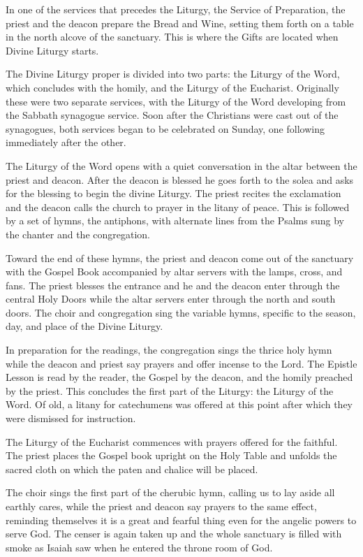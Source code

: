\documentclass[
]{article}
\begin{document}
In one of the services that precedes the Liturgy, the Service of
Preparation, the priest and the deacon prepare the Bread and Wine,
setting them forth on a table in the north alcove of the sanctuary. This
is where the Gifts are located when Divine Liturgy starts.

The Divine Liturgy proper is divided into two parts: the Liturgy of the
Word, which concludes with the homily, and the Liturgy of the Eucharist.
Originally these were two separate services, with the Liturgy of the
Word developing from the Sabbath synagogue service. Soon after the
Christians were cast out of the synagogues, both services began to be
celebrated on Sunday, one following immediately after the other.

The Liturgy of the Word opens with a quiet conversation in the altar
between the priest and deacon. After the deacon is blessed he goes forth
to the solea and asks for the blessing to begin the divine Liturgy. The
priest recites the exclamation and the deacon calls the church to prayer
in the litany of peace. This is followed by a set of hymns, the
antiphons, with alternate lines from the Psalms sung by the chanter and
the congregation.

Toward the end of these hymns, the priest and deacon come out of the
sanctuary with the Gospel Book accompanied by altar servers with the
lamps, cross, and fans. The priest blesses the entrance and he and the
deacon enter through the central Holy Doors while the altar servers
enter through the north and south doors. The choir and congregation sing
the variable hymns, specific to the season, day, and place of the Divine
Liturgy.

In preparation for the readings, the congregation sings the thrice holy
hymn while the deacon and priest say prayers and offer incense to the
Lord. The Epistle Lesson is read by the reader, the Gospel by the
deacon, and the homily preached by the priest. This concludes the first
part of the Liturgy: the Liturgy of the Word. Of old, a litany for
catechumens was offered at this point after which they were dismissed
for instruction.

The Liturgy of the Eucharist commences with prayers offered for the
faithful. The priest places the Gospel book upright on the Holy Table
and unfolds the sacred cloth on which the paten and chalice will be
placed.

The choir sings the first part of the cherubic hymn, calling us to lay
aside all earthly cares, while the priest and deacon say prayers to the
same effect, reminding themselves it is a great and fearful thing even
for the angelic powers to serve God. The censer is again taken up and
the whole sanctuary is filled with smoke as Isaiah saw when he entered
the throne room of God.
\end{document}
